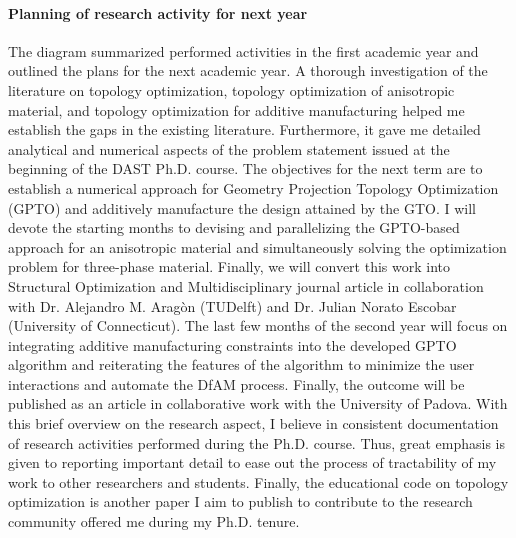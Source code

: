 \paragraph{Planning of research activity for next year}
The diagram summarized performed activities in the first academic year and outlined the plans for the next academic year. A thorough investigation of the literature on topology optimization, topology optimization of anisotropic material, and topology optimization for additive manufacturing helped me establish the gaps in the existing literature. Furthermore, it gave me detailed analytical and numerical aspects of the problem statement issued at the beginning of the DAST Ph.D. course. The objectives for the next term are to establish a numerical approach for Geometry Projection Topology Optimization (GPTO) and additively manufacture the design attained by the GTO. I will devote the starting months to devising and parallelizing the GPTO-based approach for an anisotropic material and simultaneously solving the optimization problem for three-phase material. Finally, we will convert this work into Structural Optimization and Multidisciplinary journal article in collaboration with Dr. Alejandro M. Aragòn (TUDelft) and Dr. Julian Norato Escobar (University of Connecticut). The last few months of the second year will focus on integrating additive manufacturing constraints into the developed GPTO algorithm and reiterating the features of the algorithm to minimize the user interactions and automate the DfAM process. Finally, the outcome will be published as an article in collaborative work with the University of Padova. With this brief overview on the research aspect, I believe in consistent documentation of research activities performed during the Ph.D. course. Thus, great emphasis is given to reporting important detail to ease out the process of tractability of my work to other researchers and students. Finally, the educational code on topology optimization is another paper I aim to publish to contribute to the research community offered me during my Ph.D. tenure.  
